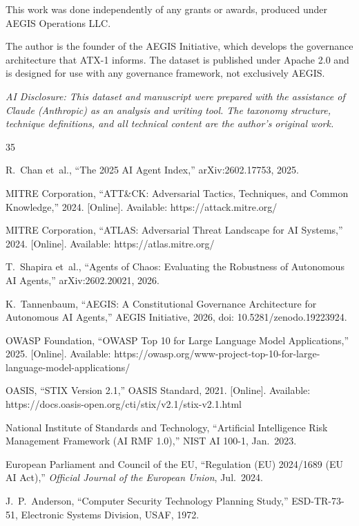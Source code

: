 \documentclass{IEEEoj-data}
\newcommand{\deleted}[1]{}
\begin{document}
This work was done independently of any grants or awards, produced under AEGIS Operations LLC.

The author is the founder of the AEGIS Initiative, which develops the governance architecture that ATX-1 informs. The dataset is published under Apache 2.0 and is designed for use with any governance framework, not exclusively AEGIS.

{\it AI Disclosure: This dataset and manuscript were prepared with the assistance of Claude (Anthropic) as an analysis and writing tool. The taxonomy structure, technique definitions, \deleted{severity assessments, }and all technical content are the author's original work.}


\begin{thebibliography}{35}

R.~Chan et~al., ``The 2025 AI Agent Index,'' arXiv:2602.17753, 2025.

MITRE Corporation, ``ATT\&CK: Adversarial Tactics, Techniques, and Common Knowledge,'' 2024. [Online]. Available: https://attack.mitre.org/

MITRE Corporation, ``ATLAS: Adversarial Threat Landscape for AI Systems,'' 2024. [Online]. Available: https://atlas.mitre.org/

T.~Shapira et~al., ``Agents of Chaos: Evaluating the Robustness of Autonomous AI Agents,'' arXiv:2602.20021, 2026.

K.~Tannenbaum, ``AEGIS: A Constitutional Governance Architecture for Autonomous AI Agents,'' AEGIS Initiative, 2026, doi: 10.5281/zenodo.19223924.

OWASP Foundation, ``OWASP Top 10 for Large Language Model Applications,'' 2025. [Online]. Available: https://owasp.org/www-project-top-10-for-large-language-model-applications/

OASIS, ``STIX Version 2.1,'' OASIS Standard, 2021. [Online]. Available: https://docs.oasis-open.org/cti/stix/v2.1/stix-v2.1.html

National Institute of Standards and Technology, ``Artificial Intelligence Risk Management Framework (AI RMF 1.0),'' NIST AI 100-1, Jan.\ 2023.

European Parliament and Council of the EU, ``Regulation (EU) 2024/1689 (EU AI Act),'' {\it Official Journal of the European Union}, Jul.\ 2024.

J.~P.~Anderson, ``Computer Security Technology Planning Study,'' ESD-TR-73-51, Electronic Systems Division, USAF, 1972.


\end{thebibliography}
\end{document}
